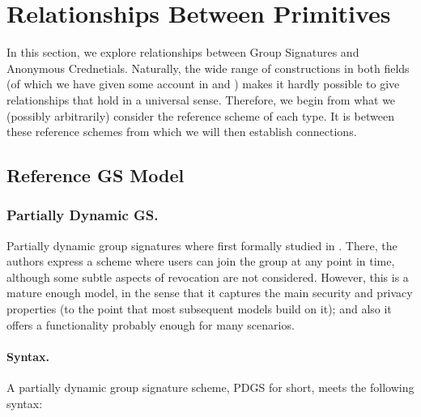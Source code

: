 \section{Relationships Between Primitives}
\label{sec:relationships}

In this section, we explore relationships between Group Signatures and Anonymous
Crednetials. Naturally, the wide range of constructions in both fields (of which
we have given some account in  and ) makes it
hardly possible to give relationships that hold in a universal sense. Therefore,
we begin from what we (possibly arbitrarily) consider the reference scheme of
each type. It is between these reference schemes from which we will then
establish connections.

\subsection{Reference GS Model}
\label{ssec:refgs}

\subsubsection{Partially Dynamic GS.} %
Partially dynamic group signatures where first formally studied in \cite{bsz05}.
There, the authors express a scheme where users can join the group at any point
in time, although some subtle aspects of revocation are not considered. However,
this is a mature enough model, in the sense that it captures the main security
and privacy properties (to the point that most subsequent models build on it);
and also it offers a functionality probably enough for many scenarios.

\paragraph{Syntax.} %
A partially dynamic group signature scheme, PDGS for short, meets the following
syntax:

